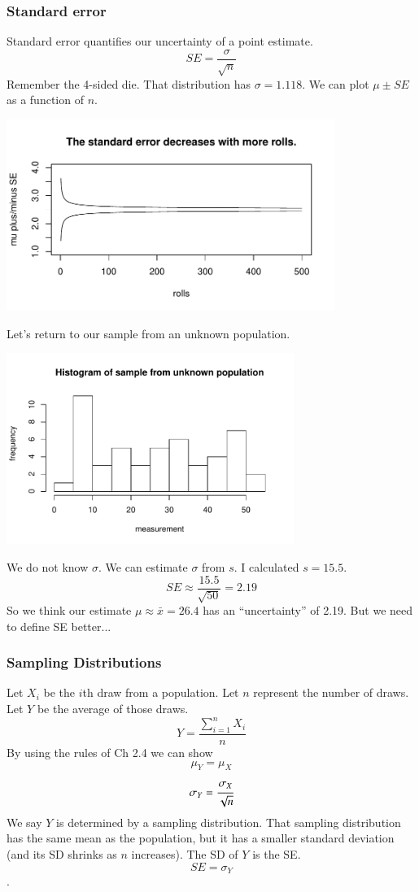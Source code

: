 \begin{frame}
\frametitle{Standard error}
Standard error quantifies our uncertainty of a point estimate.
$$SE = \frac{\sigma}{\sqrt{n}} $$
\pause
Remember the 4-sided die. That distribution has $\sigma = 1.118$. We can plot $\mu \pm SE$ as a function of $n$.
\begin{center}
\includegraphics[width=0.8\textwidth]{4-1_var_in_est/figures/running_mean_4sided_die/running_die_SE.pdf}
\end{center}
\end{frame}


\begin{frame}
Let's return to our sample from an unknown population.
\begin{center}
\includegraphics[width=0.7\textwidth]{4-1_var_in_est/figures/running_mean_4sided_die/weight_hist.pdf}
\end{center}
We do not know $\sigma$. \pause We can estimate $\sigma$ from $s$. \pause I calculated $s=15.5$.\pause
$$SE \approx \frac{15.5}{\sqrt{50}} = 2.19$$
\pause
So we think our estimate $\mu \approx \bar{x} = 26.4$ has an ``uncertainty'' of 2.19. But we need to define SE better...
\end{frame}


\begin{frame}
\frametitle{Sampling Distributions}
Let $X_i$ be the $i$th draw from a population. Let $n$ represent the number of draws. Let $Y$ be the average of those draws.
$$Y = \frac{\sum\limits_{i=1}^n X_i}{n}$$
By using the rules of Ch 2.4 we can show
$$\mu_Y = \mu_X$$
$$\sigma_{Y} = \cfrac{\sigma_X}{\sqrt{n}} $$
We say $Y$ is determined by a sampling distribution. That sampling distribution has the same mean as the population, but it has a smaller standard deviation (and its SD shrinks as $n$ increases). The SD of $Y$ is the SE.
 $$SE = \sigma_Y$$. 
\end{frame}


